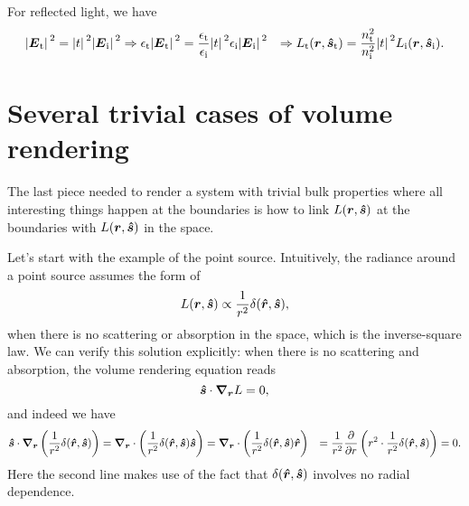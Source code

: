 \documentclass[hyperref, a4paper]{article}
\def\\{}%
\begin{document}
For reflected light, we have 
\begin{equation}
    \begin{aligned}
        \abs*{\vb*{E}_{\text{t}}}^2 = \abs*{t}^2 \abs*{\vb*{E}_{\text{i}}}^2 
        &\Rightarrow \epsilon_{\text{t}} \abs*{\vb*{E}_{\text{t}}}^2 
        = \frac{\epsilon_{\text{t}}}{\epsilon_{\text{i}}} \abs*{t}^2 \epsilon_{\text{i}} \abs*{\vb*{E}_{\text{i}}}^2 \\
        &\Rightarrow L_{\text{t}}(\vb*{r}, \vu*{s}_{\text{t}}) 
        = \frac{n_{\text{t}}^2}{n_{\text{i}}^2} \abs*{t}^2 L_{\text{i}}(\vb*{r}, \vu*{s}_{\text{i}}).
    \end{aligned}
\end{equation}

\section{Several trivial cases of volume rendering}

The last piece needed to render a system with trivial bulk properties 
where all interesting things happen at the boundaries 
is how to link $L(\vb*{r}, \vu*{s})$ at the boundaries 
with $L(\vb*{r}, \vu*{s})$ in the space. 

Let's start with the example of the point source.
Intuitively, the radiance around a point source assumes the form of 
\begin{equation}
    L(\vb*{r}, \vu*{s}) \propto \frac{1}{r^2} \delta(\vu*{r}, \vu*{s}),
    \label{eq:ideal-inverse-square}
\end{equation}
when there is no scattering or absorption in the space,
which is the inverse-square law. 
We can verify this solution explicitly: 
when there is no scattering and absorption, 
the volume rendering equation reads 
\begin{equation}
    \vu*{s} \cdot \grad_{\vb*{r}} L = 0,
\end{equation}
and indeed we have  
\begin{equation}
    \begin{aligned}
        \vu*{s} \cdot \grad_{\vb*{r}} \left(\frac{1}{r^2} \delta(\vu*{r}, \vu*{s})\right) &= 
        \grad_{\vb*{r}} \cdot \left(
            \frac{1}{r^2} \delta(\vu*{r}, \vu*{s}) \vu*{s}
        \right) 
        = \grad_{\vb*{r}} \cdot \left(
            \frac{1}{r^2} \delta(\vu*{r}, \vu*{s}) \vu*{r}
        \right) \\
        &= \frac{1}{r^2} \pdv{r} \left(
            r^2 \cdot \frac{1}{r^2} \delta(\vu*{r}, \vu*{s})
        \right) = 0.
    \end{aligned}
\end{equation}
Here the second line makes use of the fact 
that $\delta(\vu*{r}, \vu*{s})$ involves no radial dependence.
\end{document}
